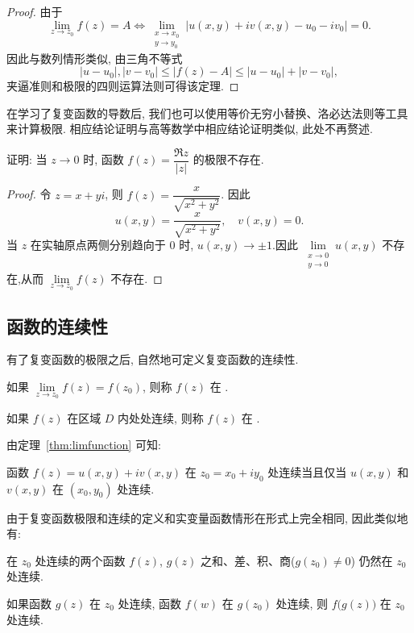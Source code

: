 \begin{proof}
  由于
  \[\lim_{z\to z_0}f(z)=A\iff
  \lim_{\substack{x\to x_0\\y\to y_0}}|u(x,y)+iv(x,y)-u_0-iv_0|=0.\]
  因此与数列情形类似, 由三角不等式
  \[|u-u_0|,|v-v_0|\le|f(z)-A|\le|u-u_0|+|v-v_0|,\]
  夹逼准则和极限的四则运算法则可得该定理.
\end{proof}

在学习了复变函数的导数后, 我们也可以使用等价无穷小替换、洛必达法则等工具来计算极限. 相应结论证明与高等数学中相应结论证明类似, 此处不再赘述.

\begin{example}
  证明: 当 $z\to0$ 时, 函数 $f(z)=\dfrac{\Re z}{|z|}$ 的极限不存在.
\end{example}

\begin{proof}
  令 $z=x+yi$, 则 $f(z)=\dfrac x{\sqrt{x^2+y^2}}$.
  因此
    \[u(x,y)=\frac x{\sqrt{x^2+y^2}},\quad v(x,y)=0.\]
  当 $z$ 在实轴原点两侧分别趋向于 $0$ 时, $u(x,y)\to\pm1$.因此 $\lim\limits_{\substack{x\to 0\\y\to0}}u(x,y)$ 不存在,从而 $\lim\limits_{z\to z_0}f(z)$ 不存在.
\end{proof}


\subsection{函数的连续性}

有了复变函数的极限之后, 自然地可定义复变函数的连续性.
\begin{definition}
  \begin{enumpar}
    \item 如果 $\lim\limits_{z\to z_0}f(z)=f(z_0)$, 则称 $f(z)$ 在 .
    \item 如果 $f(z)$ 在区域 $D$ 内处处连续, 则称 $f(z)$ 在 .
  \end{enumpar}
\end{definition}

由定理~\ref{thm:limfunction} 可知:
\begin{theorem}
  函数 $f(z)=u(x,y)+iv(x,y)$ 在 $z_0=x_0+iy_0$ 处连续当且仅当 $u(x,y)$ 和 $v(x,y)$ 在 $(x_0,y_0)$ 处连续.
\end{theorem}

由于复变函数极限和连续的定义和实变量函数情形在形式上完全相同, 因此类似地有:
\begin{theorem}
  \begin{enumpar}
    \item 在 $z_0$ 处连续的两个函数 $f(z)$, $g(z)$ 之和、差、积、商($g(z_0)\neq 0$) 仍然在 $z_0$ 处连续.
    \item 如果函数 $g(z)$ 在 $z_0$ 处连续, 函数 $f(w)$ 在 $g(z_0)$ 处连续, 则 $f\bigl(g(z)\bigr)$ 在 $z_0$ 处连续.
  \end{enumpar}
\end{theorem}

